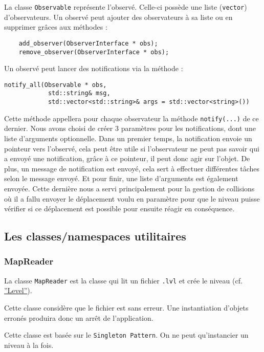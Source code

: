 \documentclass[]{article}
\begin{document}
La classe \texttt{Observable} représente l'observé. Celle-ci possède
une liste (\texttt{vector}) d'observateurs.
Un observé peut ajouter des observateurs à sa liste ou en supprimer grâces aux méthodes :
\begin{lstlisting}
    add_observer(ObserverInterface * obs);
    remove_observer(ObserverInterface * obs);
\end{lstlisting}

Un observé peut lancer des notifications via la méthode :
\begin{lstlisting}
notify_all(Observable * obs, 
            std::string& msg, 
            std::vector<std::string>& args = std::vector<string>())
\end{lstlisting}

Cette méthode appellera pour chaque observateur la méthode \texttt{notify(...)} de ce dernier.
Nous avons choisi de créer 3 paramètres pour les notifications, dont une liste d'arguments optionnelle.
Dans un premier temps, la notification envoie un pointeur vers l'observé, cela peut être utile si l'observateur
ne peut pas savoir qui a envoyé une notification, grâce à ce pointeur, il peut donc agir sur l'objet. De plus, un message
de notification est envoyé, cela sert à effectuer différentes tâches selon le message envoyé.
Et pour finir, une liste d'arguments est également envoyée. Cette dernière nous a servi principalement pour la gestion
de collisions où il a fallu envoyer le déplacement voulu en paramètre pour que le niveau puisse vérifier si ce déplacement est
possible pour ensuite réagir en conséquence.

\subsection{Les classes/namespaces utilitaires}

\subsubsection{MapReader}

La classe \texttt{MapReader} est la classe qui lit un fichier \texttt{.lvl} 
et crée le niveau (cf. \hyperref[Level]{''Level''}).

Cette classe considère que le fichier est sans erreur. Une instantiation d'objets
erronés produira donc un arrêt de l'application.

Cette classe est basée sur le \texttt{Singleton Pattern}. On ne peut qu’instancier un niveau
à la fois.
\end{document}
